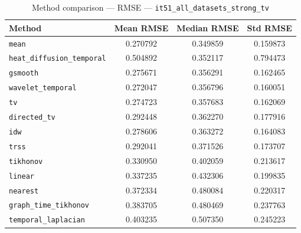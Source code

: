 \begin{table}[ht]
\centering
\caption{Method comparison — RMSE — \texttt{it51_all_datasets_strong_tv}}
\label{tab:rmse_it51_all_datasets_strong_tv}
\begin{tabular}{lccc}
\hline
Method & Mean RMSE & Median RMSE & Std RMSE \\
\hline
\texttt{mean} & 0.270792 & 0.349859 & 0.159873 \\
\texttt{heat_diffusion_temporal} & 0.504892 & 0.352117 & 0.794473 \\
\texttt{gsmooth} & 0.275671 & 0.356291 & 0.162465 \\
\texttt{wavelet_temporal} & 0.272047 & 0.356796 & 0.160051 \\
\texttt{tv} & 0.274723 & 0.357683 & 0.162069 \\
\texttt{directed_tv} & 0.292448 & 0.362270 & 0.177916 \\
\texttt{idw} & 0.278606 & 0.363272 & 0.164083 \\
\texttt{trss} & 0.292041 & 0.371526 & 0.173707 \\
\texttt{tikhonov} & 0.330950 & 0.402059 & 0.213617 \\
\texttt{linear} & 0.337235 & 0.432306 & 0.199835 \\
\texttt{nearest} & 0.372334 & 0.480084 & 0.220317 \\
\texttt{graph_time_tikhonov} & 0.383705 & 0.480469 & 0.237763 \\
\texttt{temporal_laplacian} & 0.403235 & 0.507350 & 0.245223 \\
\hline
\end{tabular}
\end{table}
